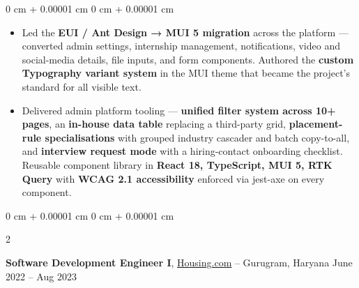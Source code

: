 \documentclass[10pt, letterpaper]{article}
\newenvironment{highlights}{
    \begin{itemize}[
        topsep=0.10 cm,
        parsep=0.10 cm,
        partopsep=0pt,
        itemsep=0pt,
        leftmargin=0 cm + 10pt
    ]
}{
    \end{itemize}
} %
\newenvironment{onecolentry}{
    \begin{adjustwidth}{
        0 cm + 0.00001 cm
    }{
        0 cm + 0.00001 cm
    }
}{
    \end{adjustwidth}
} %
\newenvironment{twocolentry}[2][]{
    \onecolentry
    \def\secondColumn{#2}
    \setcolumnwidth{\fill, 4.5 cm}
    \begin{paracol}{2}
}{
    \switchcolumn \raggedleft \secondColumn
    \end{paracol}
    \endonecolentry
} %
\let\hrefWithoutArrow\href
\begin{document}
\begin{onecolentry}
\begin{highlights}
    \item Led the \textbf{EUI / Ant Design → MUI 5 migration} across the platform — converted admin settings, internship management, notifications, video and social-media details, file inputs, and form components. Authored the \textbf{custom Typography variant system} in the MUI theme that became the project's standard for all visible text.

    \item Delivered admin platform tooling — \textbf{unified filter system across 10+ pages}, an \textbf{in-house data table} replacing a third-party grid, \textbf{placement-rule specialisations} with grouped industry cascader and batch copy-to-all, and \textbf{interview request mode} with a hiring-contact onboarding checklist. Reusable component library in \textbf{React 18, TypeScript, MUI 5, RTK Query} with \textbf{WCAG 2.1 accessibility} enforced via jest-axe on every component.

            \end{highlights}
        \end{onecolentry}


        \vspace{0.3 cm}

        \begin{twocolentry}{
            June 2022 – Aug 2023
        }
            \textbf{Software Development Engineer I}, \hrefWithoutArrow{http://www.housing.com/}{Housing.com} -- Gurugram, Haryana\end{twocolentry}
\end{document}
